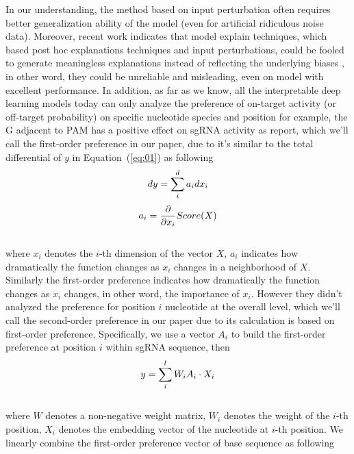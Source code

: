\documentclass{bioinfo}
\begin{document}
 In our understanding, the method based on input perturbation often requires better generalization ability of the model (even for artificial ridiculous noise data). 
 Moreover, recent work indicates that model explain techniques, which based post hoc explanations techniques and input perturbations, could be fooled to generate meaningless explanations instead of reflecting the underlying biases \citep{slack2019fooling}, 
 in other word, they could be unreliable and misleading, even on model with excellent performance. 
 In addition, as far as we know, all the interpretable deep learning models today can only analyze the preference of on-target activity (or off-target probability) on specific nucleotide species and position 
 for example, the G adjacent to PAM has a positive effect on sgRNA activity as \citeauthor{wang2019optimized} report, 
 which we'll call the first-order preference in our paper, due to it's similar to the total differential of $y$ in Equation~(\ref{eq:01}) as following
\begin{equation}
dy = \sum^{d}_ia_idx_i\label{eq:02}\vspace*{-10pt}
\end{equation}
\begin{equation}
a_i=\frac{\partial}{\partial x_i} Score(X)\label{eq:03}\vspace*{-10pt}
\end{equation}\\
 where $x_i$ denotes the $i$-th dimension of the vector $X$, 
 $a_i$ indicates how dramatically the function changes as $x_i$ changes in a neighborhood of $X$. 
 Similarly the first-order preference indicates how dramatically the function changes as $x_i$ changes, in other word, the importance of $x_i$.
 However they didn't analyzed the preference for position $i$ nucleotide at the overall level, 
 which we'll call the second-order preference in our paper due to its calculation is based on first-order preference, 
 Specifically, we use a vector $A_i$ to build the first-order preference at position $i$ within sgRNA sequence, then
\begin{equation}
y=\sum_i^lW_iA_i\cdot X_i\label{eq:04}\vspace*{-10pt}
\end{equation}\\
 where $W$ denotes a non-negative weight matrix, $W_i$ denotes the weight of the $i$-th position, $X_i$ denotes the embedding vector of the nucleotide at $i$-th position.
 We linearly combine the first-order preference vector of base sequence as following
\end{document}
